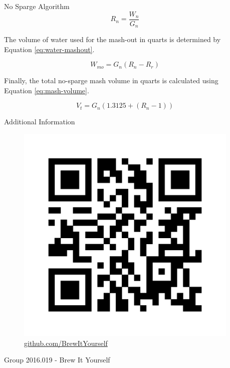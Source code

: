 \documentclass[final]{beamer}
\newlength{\sepwid}
\newlength{\onecolwid}
\begin{document}
\begin{frame}[t]
\begin{columns}[t]
\begin{column}{\onecolwid}
\begin{block}{No Sparge Algorithm}
\begin{equation}
R_{n} = \frac{W_{n}}{G_{n}}
\label{eq:mash-ratio}
\end{equation}

\noindent The volume of water used for the mash-out in quarts is determined by Equation \ref{eq:water-mashout}.

\begin{equation}
W_{mo} = G_{n}(R_{n} - R_{r})
\label{eq:water-mashout}
\end{equation}

\noindent Finally, the total no-sparge mash volume in quarts is calculated using Equation \ref{eq:mash-volume}.

\begin{equation}
V_{t} = G_{n}(1.3125 + (R_{n} - 1))
\label{eq:mash-volume}
\end{equation}

\end{block}


\begin{alertblock}{Additional Information}

\begin{figure}
\includegraphics[width=0.4\linewidth]{qr-biy.png}
\caption{\href{https://github.com/BrewItYourself}{github.com/BrewItYourself}}
\end{figure}

\end{alertblock}

\begin{flushright}
Group 2016.019 - Brew It Yourself
\end{flushright}


\end{column} %

\begin{column}{\sepwid}\end{column} %

\end{columns} %

\end{frame} %
\end{document}
